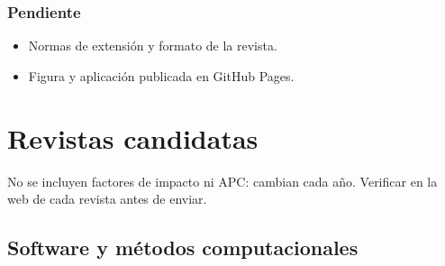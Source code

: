 \documentclass[
  10pt,
]{article}
\providecommand{\tightlist}{%
  \setlength{\itemsep}{0pt}\setlength{\parskip}{0pt}}
\begin{document}
\hypertarget{pendiente}{%
\subsubsection{Pendiente}\label{pendiente}}

\begin{itemize}
\tightlist
\item[$\square$]
  Normas de extensión y formato de la revista.
\item[$\square$]
  Figura y aplicación publicada en GitHub Pages.
\end{itemize}

\newpage

\hypertarget{revistas-candidatas}{%
\section{Revistas candidatas}\label{revistas-candidatas}}

No se incluyen factores de impacto ni APC: cambian cada año. Verificar
en la web de cada revista antes de enviar.

\hypertarget{software-y-muxe9todos-computacionales}{%
\subsection{Software y métodos
computacionales}\label{software-y-muxe9todos-computacionales}}
\end{document}
